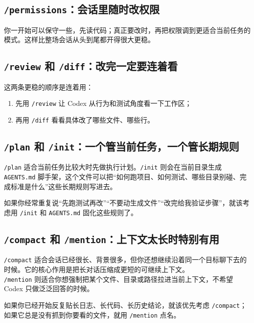 \documentclass[UTF8,a4paper,12pt]{ctexart}
\begin{document}
\subsection{\texttt{/permissions}：会话里随时改权限}

你一开始可以保守一些，先读代码；真正要改时，再把权限调到更适合当前任务的模式。这样比整场会话从头到尾都开得很大更稳。

\subsection{\texttt{/review} 和 \texttt{/diff}：改完一定要连着看}

这两条更稳的顺序是连着用：
\begin{enumerate}
  \item 先用 \texttt{/review} 让 Codex 从行为和测试角度看一下工作区；
  \item 再用 \texttt{/diff} 看看具体改了哪些文件、哪些行。
\end{enumerate}

\subsection{\texttt{/plan} 和 \texttt{/init}：一个管当前任务，一个管长期规则}

\texttt{/plan} 适合当前任务比较大时先做执行计划。\texttt{/init} 则会在当前目录生成 \texttt{AGENTS.md} 脚手架，这个文件可以把“如何跑项目、如何测试、哪些目录别碰、完成标准是什么”这些长期规则写进去。

\begin{tipbox}
如果你经常重复说“先跑测试再改”“不要动生成文件”“改完给我验证步骤”，就该考虑用 \texttt{/init} 和 \texttt{AGENTS.md} 固化这些规则了。
\end{tipbox}

\subsection{\texttt{/compact} 和 \texttt{/mention}：上下文太长时特别有用}

\texttt{/compact} 适合会话已经很长、背景很多，但你还想继续沿着同一个目标聊下去的时候。它的核心作用是把长对话压缩成更短的可继续上下文。\\
\texttt{/mention} 则适合你想强制把某个文件、目录或路径拉进当前上下文，不希望 Codex 只做泛泛回答的时候。

\begin{tipbox}
如果你已经开始反复贴长日志、长代码、长历史结论，就该优先考虑 \texttt{/compact}；如果它总是没有抓到你要看的文件，就用 \texttt{/mention} 点名。
\end{tipbox}
\end{document}
